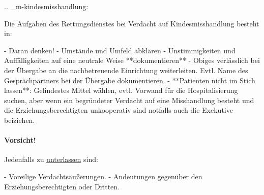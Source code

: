 
.. _m-kindesmisshandlung:


Die Aufgaben des Rettungsdienstes bei Verdacht auf Kindesmisshandlung besteht in:

\begin{enumerate}
  -   Daran denken!
  -   Umstände und Umfeld abklären
  -   Unstimmigkeiten und Auffälligkeiten auf eine neutrale Weise
  **dokumentieren**
  -   Obiges verlässlich bei der Übergabe an die nachbetreuende Einrichtung
  weiterleiten. Evtl. Name des Gesprächpartners bei der  Übergabe dokumentieren.
  -   **Patienten nicht im Stich lassen**: Gelindestes Mittel wählen,
  evtl. Vorwand für die Hospitalisierung suchen, aber wenn ein begründeter
  Verdacht auf eine Misshandlung besteht und die
  Erziehungsberechtigten unkooperativ sind notfalls auch die Exekutive beiziehen.
\end{enumerate}

\paragraph{Vorsicht!}

Jedenfalls zu \underline{unterlassen} sind:

\begin{itemize}
  -   Voreilige Verdachtsäußerungen. 
  -   Andeutungen gegenüber den Erziehungsberechtigten oder Dritten.
\end{itemize}
